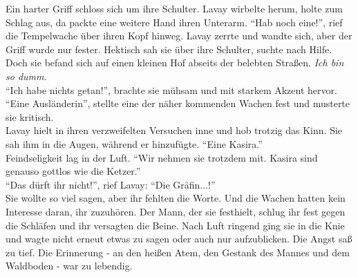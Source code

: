 Ein harter Griff schloss sich um ihre Schulter. Lavay wirbelte herum, holte zum Schlag aus, da 
packte eine weitere Hand ihren Unterarm. ``Hab noch eine!'', rief die Tempelwache über ihren Kopf 
hinweg. Lavay zerrte und wandte sich, aber der Griff wurde nur fester. Hektisch sah sie über ihre 
Schulter, suchte nach Hilfe. Doch sie befand sich auf einen kleinen Hof abseits der belebten 
Straßen. \textit{Ich bin so dumm.}\\
``Ich habe nichts getan!'', brachte sie mühsam und mit starkem Akzent hervor.\\
``Eine Ausländerin'', stellte eine der näher kommenden Wachen fest und musterte sie kritisch.\\
Lavay hielt in ihren verzweifelten Versuchen inne und hob trotzig das Kinn. Sie sah ihm in die 
Augen, während er hinzufügte. ``Eine Kasira.''\\
Feindseligkeit lag in der Luft. ``Wir nehmen sie trotzdem mit. Kasira sind genauso gottlos wie die 
Ketzer.''\\
``Das dürft ihr nicht!'', rief Lavay: ``Die Gräfin...!''\\
Sie wollte so viel sagen, aber ihr fehlten die Worte. Und die Wachen hatten kein Interesse daran, 
ihr zuzuhören. Der Mann, der sie festhielt, schlug ihr fest gegen die Schläfen und ihr versagten 
die Beine. Nach Luft ringend ging sie in die Knie und wagte nicht erneut etwas zu sagen oder auch 
nur aufzublicken. Die Angst saß zu tief. Die Erinnerung - an den heißen Atem, den Gestank des Mannes 
und dem Waldboden - war zu lebendig.\\


